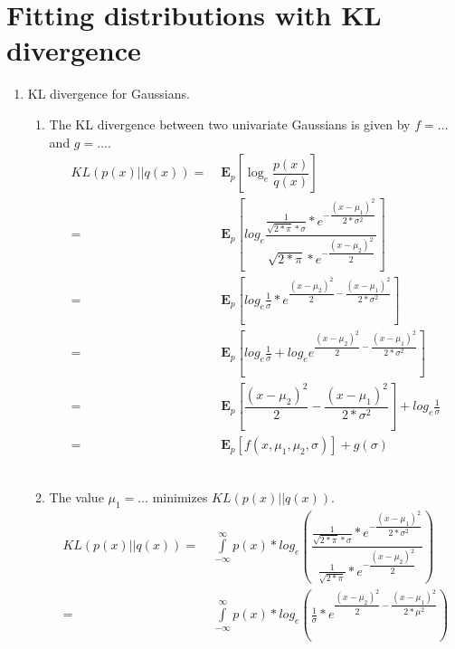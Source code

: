\documentclass[english]{article}
\newcommand{\E}{\mathbf{E}}
\begin{document}
\section{Fitting distributions with KL divergence}

\begin{enumerate}
\item KL divergence for Gaussians.
  \begin{enumerate}
  \item The KL divergence between two univariate Gaussians is given by
    $f = \ldots$ and $g = \ldots$.
    \begin{align*}
      KL(p(x) || q(x)) =&\; \E_p \left[\log_e {\dfrac{p(x)}{q(x)}}\right] \\
      =&\;  \E_p \left[ log_e{\dfrac{\frac{1}{\sqrt{2*\pi}*\sigma} * e ^ {-\dfrac{(x - \mu_1)^2}{2*\sigma^2}}}
						{\sqrt{2*\pi} * e ^ {-\dfrac{(x - \mu_2)^2}{2}}}}\right]\\
      =&\; \E_p \left[ log_e {\frac{1}{\sigma} * e ^ {\dfrac{(x - \mu_2)^2}{2} - \dfrac{(x - \mu_1)^2}{2*\sigma^2}}}\right] \\
      =&\; \E_p \left[log_e{\frac{1}{\sigma}} + log_e  e ^ {\dfrac{(x - \mu_2)^2}{2} - \dfrac{(x - \mu_1)^2}{2*\sigma^2}}\right] \\
      =&\; \E_p \left[{\dfrac{(x - \mu_2)^2}{2} - \dfrac{(x - \mu_1)^2}{2*\sigma^2}}\right] + log_e {\frac{1}{\sigma}} \\
      =&\; \mathbf{E}_p[ f(x, \mu_1, \mu_2, \sigma)] + g(\sigma)
    \end{align*}\\
  \item The value $\mu_1 = \ldots$ minimizes $KL(p(x)||q(x))$.
    \begin{align*}
	KL(p(x)||q(x)) =&\; \int\limits_{-\infty}^{\infty} p(x) * 
				log_e \left( \dfrac
					  {
					   \frac{1}
						{
						 \sqrt
						   {
							2* \pi
						   } 
						* \sigma
						}
					    * e ^ 
						{
						-\dfrac
							{
								(x - \mu_1)^2
							}
							{
								2 * \sigma^2
							}
						}
					} 	
					{
					 \frac{1}
						{
						   \sqrt
							{
							2*\pi
							}
						 }
					  *  e ^ 
						{
						-\dfrac
						      {
							(x - \mu_2)^2
						       }
						     {
							2
						     }
						}
					}
					 \right) \\
=&\; \int\limits_{-\infty}^{\infty} p(x) * log_e \left( \frac{1}{\sigma} * e ^ {\dfrac{(x-\mu_2)^2}{2} - \dfrac{(x - \mu_1)^2}{2*\mu^2}} \right) \\

\end{align*}
\end{enumerate}
\end{enumerate}
\end{document}
